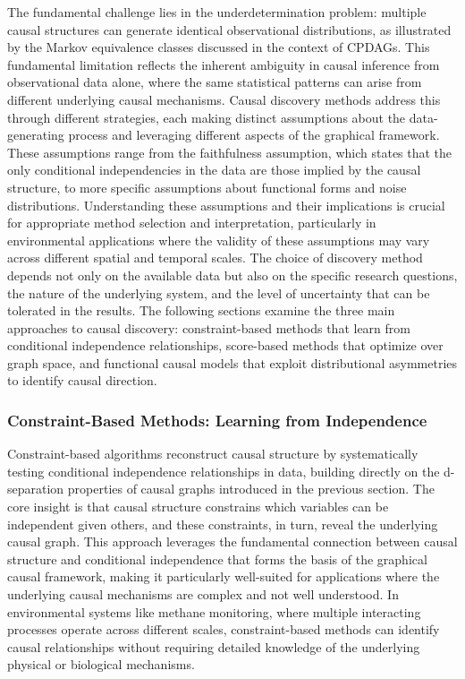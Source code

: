 The fundamental challenge lies in the underdetermination problem: multiple causal structures can generate identical observational distributions, as illustrated by the Markov equivalence classes discussed in the context of CPDAGs. This fundamental limitation reflects the inherent ambiguity in causal inference from observational data alone, where the same statistical patterns can arise from different underlying causal mechanisms. Causal discovery methods address this through different strategies, each making distinct assumptions about the data-generating process and leveraging different aspects of the graphical framework. These assumptions range from the faithfulness assumption, which states that the only conditional independencies in the data are those implied by the causal structure, to more specific assumptions about functional forms and noise distributions. Understanding these assumptions and their implications is crucial for appropriate method selection and interpretation, particularly in environmental applications where the validity of these assumptions may vary across different spatial and temporal scales. The choice of discovery method depends not only on the available data but also on the specific research questions, the nature of the underlying system, and the level of uncertainty that can be tolerated in the results. The following sections examine the three main approaches to causal discovery: constraint-based methods that learn from conditional independence relationships, score-based methods that optimize over graph space, and functional causal models that exploit distributional asymmetries to identify causal direction.

\subsubsection{Constraint-Based Methods: Learning from Independence}

Constraint-based algorithms reconstruct causal structure by systematically testing conditional independence relationships in data, building directly on the d-separation properties of causal graphs introduced in the previous section. The core insight is that causal structure constrains which variables can be independent given others, and these constraints, in turn, reveal the underlying causal graph. This approach leverages the fundamental connection between causal structure and conditional independence that forms the basis of the graphical causal framework, making it particularly well-suited for applications where the underlying causal mechanisms are complex and not well understood. In environmental systems like methane monitoring, where multiple interacting processes operate across different scales, constraint-based methods can identify causal relationships without requiring detailed knowledge of the underlying physical or biological mechanisms.

